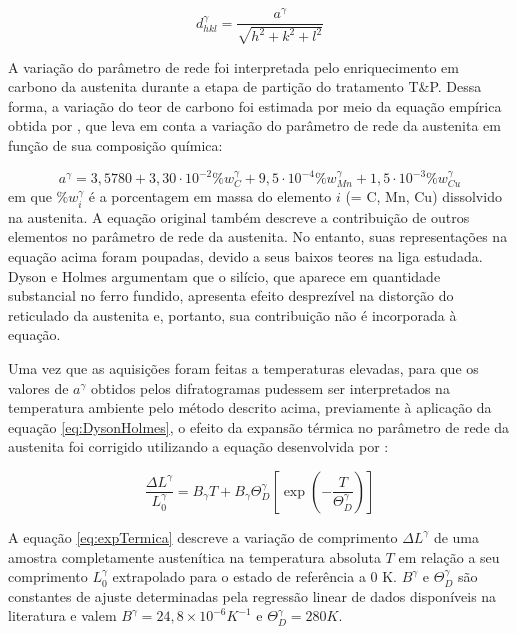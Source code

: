 \begin{equation}
	d_{hkl}^\gamma = \frac{a^\gamma}{\sqrt{h^2 + k^2 + l^2}}
	\label{eq:parametroRede}
\end{equation}

A variação do parâmetro de rede foi interpretada pelo enriquecimento em carbono da austenita durante a etapa de partição do tratamento T\&P. Dessa forma, a variação do teor de carbono foi estimada por meio da equação empírica obtida por , que leva em conta a variação do parâmetro de rede da austenita em função de sua composição química:

\begin{equation}
	a^\gamma = 3,5780 + 3,30\cdot10^{-2} \%w_C^\gamma + 9,5\cdot10^{-4} \%w_{Mn}^\gamma + 1,5\cdot10^{-3} \%w_{Cu}^\gamma
	\label{eq:DysonHolmes}
\end{equation}
%
em que $\%w_i^\gamma$ é a porcentagem em massa do elemento $i$ (= C, Mn, Cu) dissolvido na austenita. A equação original também descreve a contribuição de outros elementos no parâmetro de rede da austenita. No entanto, suas representações na equação acima foram poupadas, devido a seus baixos teores na liga estudada. Dyson e Holmes argumentam que o silício, que aparece em quantidade substancial no ferro fundido, apresenta efeito desprezível na distorção do reticulado da austenita e, portanto, sua contribuição não é incorporada à equação.

Uma vez que as aquisições foram feitas a temperaturas elevadas, para que os valores de $a^\gamma$ obtidos pelos difratogramas pudessem ser interpretados na temperatura ambiente pelo método descrito acima, previamente à aplicação da equação \ref{eq:DysonHolmes}, o efeito da expansão térmica no parâmetro de rede da austenita foi corrigido utilizando a equação desenvolvida por :

\begin{equation}
	\frac{\Delta L^\gamma}{L_0^\gamma} = B_\gamma T + B_\gamma \Theta_D^\gamma \left[ \exp{\left( -\frac{T}{\Theta_D^\gamma} \right)}\right]
	\label{eq:expTermica}
\end{equation}

A equação \ref{eq:expTermica} descreve a variação de comprimento $\Delta L^\gamma$ de uma amostra completamente austenítica na temperatura absoluta $T$ em relação a seu comprimento $L_0^\gamma$ extrapolado para o estado de referência a 0 K. $B^\gamma$ e $\Theta_D^\gamma$ são constantes de ajuste determinadas pela regressão linear de dados disponíveis na literatura e valem $B^\gamma = 24,8 \times 10^{-6} K^{-1}$ e $\Theta_D^\gamma = 280 K$.

